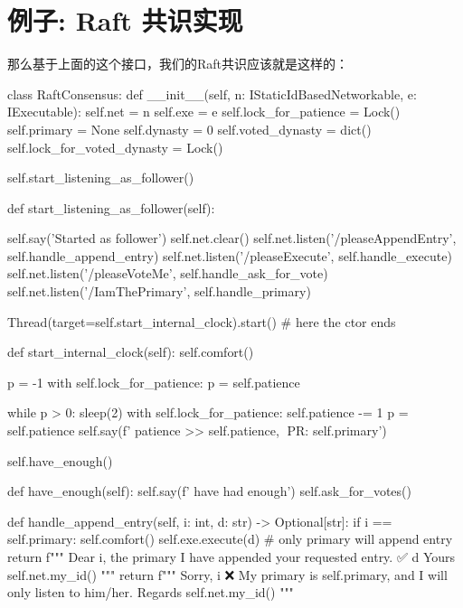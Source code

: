 \section{例子: Raft 共识实现}
那么基于上面的这个接口，我们的Raft共识应该就是这样的：
\begin{simplepy}
class RaftConsensus:
    def __init__(self,
                 n: IStaticIdBasedNetworkable,
                 e: IExecutable):
        self.net = n
        self.exe = e
        self.lock_for_patience = Lock()
        self.primary = None
        self.dynasty = 0
        self.voted_dynasty = dict()
        self.lock_for_voted_dynasty = Lock()

        self.start_listening_as_follower()

    def start_listening_as_follower(self):

        self.say('Started as follower')
        self.net.clear()
        self.net.listen('/pleaseAppendEntry', self.handle_append_entry)
        self.net.listen('/pleaseExecute', self.handle_execute)
        self.net.listen('/pleaseVoteMe', self.handle_ask_for_vote)
        self.net.listen('/IamThePrimary', self.handle_primary)

        Thread(target=self.start_internal_clock).start()  # here the ctor ends

    def start_internal_clock(self):
        self.comfort()

        p = -1
        with self.lock_for_patience:
            p = self.patience

        while p > 0:
            sleep(2)
            with self.lock_for_patience:
                self.patience -= 1
                p = self.patience
            self.say(f' patience >> {self.patience}, 🐢PR: {self.primary}')

        self.have_enough()

    def have_enough(self):
        self.say(f' have had enough')
        self.ask_for_votes()

    def handle_append_entry(self, i: int, d: str) -> Optional[str]:
        if i == self.primary:
            self.comfort()
            self.exe.execute(d)     # only primary will append entry
            return f"""
            Dear {i}, the primary
                 I have appended your requested entry. ✅️ {d}
                        Yours {self.net.my_id()}
            """
        return f"""
        Sorry, {i} ❌️
             My primary is {self.primary}, and I will only listen to him/her.
                Regards {self.net.my_id()}
        """


\end{simplepy}
